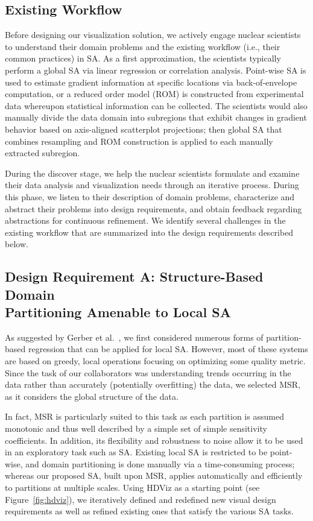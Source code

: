 \subsection{Existing Workflow}
Before designing our visualization solution, we actively engage nuclear scientists to understand their domain problems and the existing workflow (i.e., their common practices) in SA.
%
As a first approximation, the scientists typically perform a global SA via linear regression or correlation analysis.
%
Point-wise SA is used to estimate gradient information at specific locations via back-of-envelope computation, or a reduced order model (ROM) is constructed from experimental data whereupon statistical information can be collected.
%
The scientists would also manually divide the data domain into subregions that exhibit changes in gradient behavior based on axis-aligned scatterplot projections; then global SA that combines resampling and ROM construction is applied to each manually extracted subregion.

During the discover stage, we help the nuclear scientists formulate and examine their data analysis and visualization needs through an iterative process.
%
During this phase, we listen to their description of domain problems, characterize and abstract their problems into design requirements, and obtain feedback regarding abstractions for continuous refinement.
%
We identify several challenges in the existing workflow that are summarized into the design requirements described below.

\subsection{Design Requirement A: Structure-Based Domain\\Partitioning Amenable to Local SA}
As suggested by Gerber et al.~\cite{GerberRubelBremer2011}, we first considered numerous forms of partition-based regression that can be applied for local SA.
%
However, most of these systems are based on greedy, local operations focusing on optimizing some quality metric.
%
Since the task of our collaborators was understanding trends occurring in the data rather than accurately (potentially overfitting) the data, we selected MSR, as it considers the global structure of the data.

In fact, MSR is particularly suited to this task as each partition is assumed monotonic and thus well described by a simple set of simple sensitivity coefficients.
%
In addition, its flexibility and robustness to noise allow it to be used in an exploratory task such as SA.
%
Existing local SA is restricted to be point-wise, and domain partitioning is done manually via a time-consuming process; whereas our proposed SA, built upon MSR, applies automatically and efficiently to partitions at multiple scales.
%
Using HDViz as a starting point (see Figure~\ref{fig:hdviz}), we iteratively defined and redefined new visual design requirements as well as refined existing ones that satisfy the various SA tasks.

